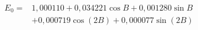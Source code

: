 \documentclass[border=3pt]{standalone}
\begin{document}
\pagecolor{bg}\color{fg}
$\displaystyle\begin{aligned}E_0={}&1{,}000110+0{,}034221\cos B+0{,}001280\sin B\\&+0{,}000719\cos(2B)+0{,}000077\sin(2B)\end{aligned}$
\end{document}

